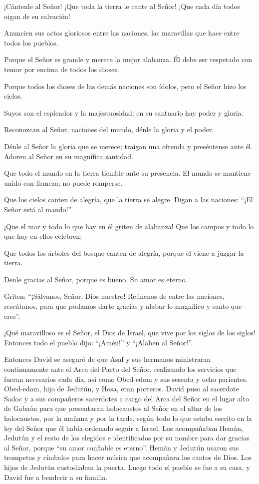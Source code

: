  ¡Cántenle al Señor! ¡Que toda la tierra le cante al Señor!
¡Que cada día todos oigan de su salvación!

 Anuncien sus actos gloriosos entre las naciones, las
maravillas que hace entre todos los pueblos.

 Porque el Señor es grande y merece la mejor alabanza. Él
debe ser respetado con temor por encima de todos los dioses.

 Porque todos los dioses de las demás naciones son ídolos,
pero el Señor hizo los cielos.

 Suyos son el esplendor y la majestuosidad; en su santuario
hay poder y gloria.

 Reconozcan al Señor, naciones del mundo, dénle la gloria y
el poder.

 Dénle al Señor la gloria que se merece; traigan una
ofrenda y preséntense ante él. Adoren al Señor en su magnífica santidad.

 Que todo el mundo en la tierra tiemble ante su presencia.
El mundo se mantiene unido con firmeza; no puede romperse.

 Que los cielos canten de alegría, que la tierra se alegre.
Digan a las naciones: ``¡El Señor está al mando!''

 ¡Que el mar y todo lo que hay en él griten de alabanza!
Que los campos y todo lo que hay en ellos celebren;

 Que todos los árboles del bosque canten de alegría, porque
él viene a juzgar la tierra.

 Denle gracias al Señor, porque es bueno. Su amor es
eterno.

 Griten: ``¡Sálvanos, Señor, Dios nuestro! Reúnenos de
entre las naciones, rescátanos, para que podamos darte gracias y alabar
lo magnífico y santo que eres''.

 ¡Qué maravilloso es el Señor, el Dios de Israel, que vive
por los siglos de los siglos! Entonces todo el pueblo dijo: ``¡Amén!'' y
``¡Alaben al Señor!''.

 Entonces David se aseguró de que Asaf y sus hermanos
ministraran continuamente ante el Arca del Pacto del Señor, realizando
los servicios que fueran necesarios cada día,  así como
Obed-edom y sus sesenta y ocho parientes. Obed-edom, hijo de Jedutún, y
Hosa, eran porteros.  David puso al sacerdote Sadoc y a sus
compañeros sacerdotes a cargo del Arca del Señor en el lugar alto de
Gabaón  para que presentaran holocaustos al Señor en el
altar de los holocaustos, por la mañana y por la tarde, según todo lo
que estaba escrito en la ley del Señor que él había ordenado seguir a
Israel.  Los acompañaban Hemán, Jedutún y el resto de los
elegidos e identificados por su nombre para dar gracias al Señor, porque
``su amor confiable es eterno''.  Hemán y Jedutún usaron
sus trompetas y címbalos para hacer música que acompañara los cantos de
Dios. Los hijos de Jedutún custodiaban la puerta.  Luego
todo el pueblo se fue a su casa, y David fue a bendecir a su familia.

